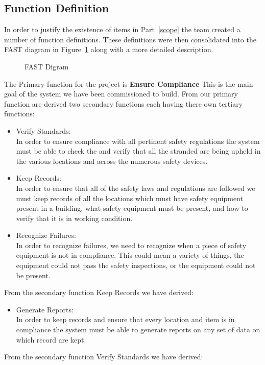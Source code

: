 \documentclass[Letter,11pt]{article}
\begin{document}
	\subsection{Function Definition} 
		In order to justify the existence of items in Part~\ref{scope} the team created a number of function definitions. These definitions were then consolidated into the FAST diagram in Figure~\ref{fast1} along with a more detailed description.
		\begin{figure}[h]
			\centering
			
			\caption{\label{fast1} FAST Digram}
		\end{figure}
		The Primary function for the project is \textbf{Ensure Compliance} This is the main goal of the system we have been commissioned to build. From our primary function are derived two secondary functions each having there own tertiary functions:
		\begin{itemize}
			\item Verify Standards:\\
			In order to ensure compliance with all pertinent safety regulations the system must be able to check the and verify that all the stranded are being upheld in the various locations and across the numerous safety devices.
			\item Keep Records:\\
			In order to ensure that all of the safety laws and regulations are followed we must keep records of all the locations which must have safety equipment present in a building, what safety equipment must be present, and how to verify that it is in working condition.  

			\item Recognize Failures:\\
			In order to recognize failures, we need to recognize when a piece of safety equipment is not in compliance. This could mean a variety of things, the equipment could not pass the safety inspections, or the equipment could not be present.   

		\end{itemize}
		From the secondary function Keep Records we have derived: 
		\begin{itemize}
			\item Generate Reports:\\
			In order to keep records and ensure that every location and item is in compliance the system must be able to generate reports on any set of data on which record are kept. 
		\end{itemize}
		From the secondary function Verify Standards we have derived:
\end{document}
